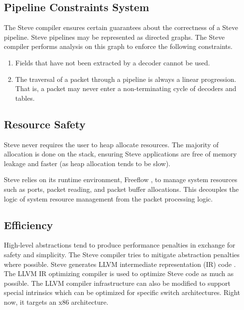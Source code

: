 \subsection{Pipeline Constraints System}

The Steve compiler ensures certain guarantees about the correctness of a Steve
pipeline. Steve pipelines may be represented as directed graphs. The
Steve compiler performs analysis on this graph to enforce the following
constraints.

\begin{enumerate}
\item Fields that have not been extracted by a decoder cannot be used. 

\item The traversal of a packet through a pipeline is always a linear
progression. That is, a packet may never enter a non-terminating cycle
of decoders and tables.
\end{enumerate}

\subsection{Resource Safety}

Steve never requires the user to heap allocate resources. The majority of
allocation is done on the stack, ensuring Steve applications are free of
memory leakage and faster (as heap allocation tends to be slow).

Steve relies on its runtime environment, Freeflow \cite{freeflow_software}, 
to manage system resources such as
ports, packet reading, and packet buffer allocations.
This decouples the logic of system resource management from the packet
processing logic.

\subsection{Efficiency}


High-level abstractions tend to produce performance penalties in exchange for safety and simplicity. 
The Steve compiler tries to mitigate abstraction penalties where possible. 
Steve generates LLVM intermediate representation (IR) code
\cite{llvm_webpage}. 
The LLVM IR optimizing compiler is used to optimize Steve code as much as possible.
The LLVM compiler infrastructure can also be modified to support special intrinsics which can be optimized for specific switch architectures. 
Right now, it targets an x86 architecture.

